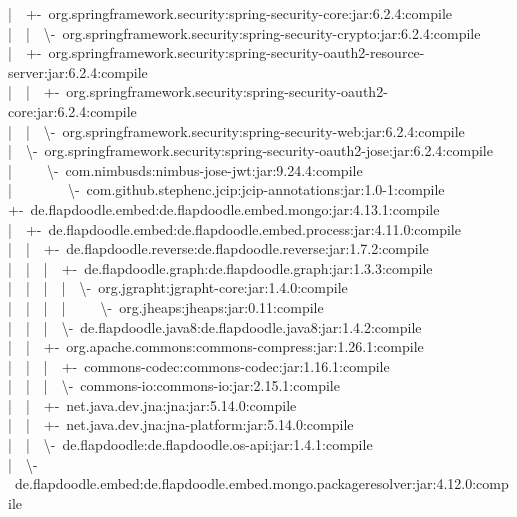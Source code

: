\documentclass[
    paper=a4,
    twoside=false,
    parskip=half,
    listof=entryprefix,
    listof=totoc,
    index=totoc,
    bibliography=totoc,
    headsepline,
]{scrbook}
\begin{document}
    |~~+-~org.springframework.security:spring-security-core:jar:6.2.4:compile\\
    |~~|~~\textbackslash-~org.springframework.security:spring-security-crypto:jar:6.2.4:compile\\
    |~~+-~org.springframework.security:spring-security-oauth2-resource-server:jar:6.2.4:compile\\
    |~~|~~+-~org.springframework.security:spring-security-oauth2-core:jar:6.2.4:compile\\
    |~~|~~\textbackslash-~org.springframework.security:spring-security-web:jar:6.2.4:compile\\
    |~~\textbackslash-~org.springframework.security:spring-security-oauth2-jose:jar:6.2.4:compile\\
    |~~~~~\textbackslash-~com.nimbusds:nimbus-jose-jwt:jar:9.24.4:compile\\
    |~~~~~~~~\textbackslash-~com.github.stephenc.jcip:jcip-annotations:jar:1.0-1:compile\\
    +-~de.flapdoodle.embed:de.flapdoodle.embed.mongo:jar:4.13.1:compile\\
    |~~+-~de.flapdoodle.embed:de.flapdoodle.embed.process:jar:4.11.0:compile\\
    |~~|~~+-~de.flapdoodle.reverse:de.flapdoodle.reverse:jar:1.7.2:compile\\
    |~~|~~|~~+-~de.flapdoodle.graph:de.flapdoodle.graph:jar:1.3.3:compile\\
    |~~|~~|~~|~~\textbackslash-~org.jgrapht:jgrapht-core:jar:1.4.0:compile\\
    |~~|~~|~~|~~~~~\textbackslash-~org.jheaps:jheaps:jar:0.11:compile\\
    |~~|~~|~~\textbackslash-~de.flapdoodle.java8:de.flapdoodle.java8:jar:1.4.2:compile\\
    |~~|~~+-~org.apache.commons:commons-compress:jar:1.26.1:compile\\
    |~~|~~|~~+-~commons-codec:commons-codec:jar:1.16.1:compile\\
    |~~|~~|~~\textbackslash-~commons-io:commons-io:jar:2.15.1:compile\\
    |~~|~~+-~net.java.dev.jna:jna:jar:5.14.0:compile\\
    |~~|~~+-~net.java.dev.jna:jna-platform:jar:5.14.0:compile\\
    |~~|~~\textbackslash-~de.flapdoodle:de.flapdoodle.os-api:jar:1.4.1:compile\\
    |~~\textbackslash-~de.flapdoodle.embed:de.flapdoodle.embed.mongo.packageresolver:jar:4.12.0:compile\\
\end{document}
